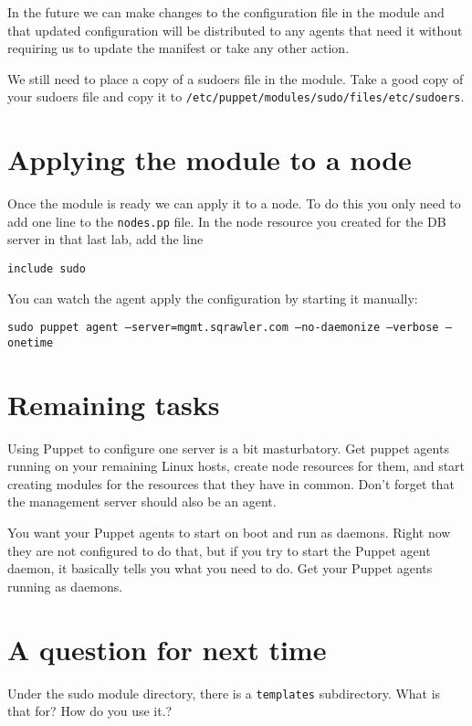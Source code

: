 \documentclass{article}   	%
\begin{document}
In the future we can make changes to the configuration file in the module and that updated configuration will be distributed to any agents that need it without requiring us to update the manifest or take any other action.

We still need to place a copy of a sudoers file in the module.  Take a good copy of your sudoers file and copy it to \texttt{/etc/puppet/modules/sudo/files/etc/sudoers}.

\section*{Applying the module to a node}
Once the module is ready we can apply it to a node.  To do this you only need to add one line to the \texttt{nodes.pp} file.  In the node resource you created for the DB server in that last lab, add the line

\texttt{include sudo}

You can watch the agent apply the configuration by starting it manually:

\texttt{sudo puppet agent --server=mgmt.sqrawler.com --no-daemonize --verbose --onetime}

\section*{Remaining tasks}
Using Puppet to configure one server is a bit masturbatory.  Get puppet agents running on your remaining Linux hosts, create node resources for them, and start creating modules for the resources that they have in common.  Don't forget that the management server should also be an agent.

You want your Puppet agents to start on boot and run as daemons.  Right now they are not configured to do that, but if you try to start the Puppet agent daemon, it basically tells you what you need to do.  Get your Puppet agents running as daemons. 

\section*{A question for next time}
Under the sudo module directory, there is a \texttt{templates} subdirectory.  What is that for?  How do you use it.?
\end{document}
